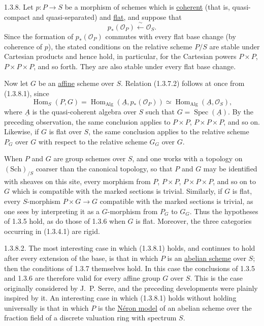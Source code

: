 
1.3.8. Let $p:P\longrightarrow S$ be a morphism of schemes which is
\underline{coherent} (that is, quasi-compact and quasi-separated) and
\underline{flat}, and suppose that
\begin{equation}\tag{1.3.8.1}
 p_*(\mathcal O_P)\xleftarrow{\ \sim\ }\mathcal O_S.
\end{equation}
Since the formation of $p_*(\mathcal O_P)$ commutes with every flat base
change (by coherence of $p$), the stated conditions on the relative
scheme $P/S$ are stable under Cartesian products and hence hold, in
particular, for the Cartesian powers $P\times P$,
$P\times P\times P$, and so forth. They are also stable under every flat
base change.

Now let $G$ be an \underline{affine} scheme over $S$. Relation
(1.3.7.2) follows at once from (1.3.8.1), since
\[
 \operatorname{Hom}_S(P,G)
 =\operatorname{Hom}_{\mathrm{Alg}}(\underline A,p_*(\mathcal O_P))
 \simeq\operatorname{Hom}_{\mathrm{Alg}}(\underline A,\mathcal O_S),
\]
where $\underline A$ is the quasi-coherent algebra over $S$ such that
$G=\operatorname{Spec}(\underline A)$. By the preceding observation,
the same conclusion applies to $P\times P$, $P\times P\times P$, and
so on. Likewise, if $G$ is flat over $S$, the same conclusion applies
to the relative scheme $P_G$ over $G$ with respect to the relative
scheme $G_G$ over $G$.

When $P$ and $G$ are group schemes over $S$, and one works with a
topology on $(\mathrm{Sch})_{/S}$ coarser than the canonical topology,
so that $P$ and $G$ may be identified with sheaves on this site, every
morphism from $P$, $P\times P$, $P\times P\times P$, and so on to $G$
which is compatible with the marked sections is trivial. Similarly, if
$G$ is flat, every $S$-morphism $P\times G\longrightarrow G$ compatible
with the marked sections is trivial, as one sees by interpreting it as
a $G$-morphism from $P_G$ to $G_G$. Thus the hypotheses of 1.3.5 hold,
as do those of 1.3.6 when $G$ is flat. Moreover, the three categories
occurring in (1.3.4.1) are rigid.


1.3.8.2. The most interesting case in which (1.3.8.1) holds, and
continues to hold after every extension of the base, is that in which
$P$ is an \underline{abelian scheme} over $S$; then the conditions of
1.3.7 themselves hold. In this case the conclusions of 1.3.5 and 1.3.6
are therefore valid for every affine group $G$ over $S$. This is the
case originally considered by J.~P. Serre, and the preceding
developments were plainly inspired by it. An interesting case in which
(1.3.8.1) holds without holding universally is that in which $P$ is the
\underline{N\'eron model} of an abelian scheme over the fraction field
of a discrete valuation ring with spectrum $S$.

